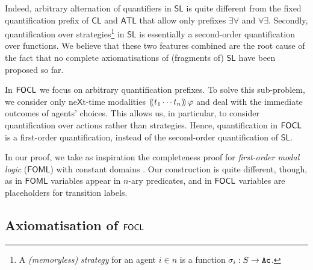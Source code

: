 \documentclass{article}
\begin{document}
Indeed, arbitrary alternation of quantifiers in $\mathsf{SL}$ is quite different from the fixed quantification prefix of $\mathsf{CL}$ and $\mathsf{ATL}$ that allow only prefixes $\exists \forall$ and $\forall \exists$. Secondly, quantification over strategies\footnote{A \emph{(memoryless) strategy} for an agent $i \in n$ is a function $\sigma_i: S \to \texttt{Ac}$.}  in $\mathsf{SL}$ is essentially a second-order quantification over functions. We believe that these two features combined are the root cause of the fact that no complete axiomatisations of (fragments of) $\mathsf{SL}$ %
have been proposed so far. 

In $\mathsf{FOCL}$ we focus on arbitrary quantification prefixes. To solve this sub-problem, we consider only ne$\mathsf{X}$t-time modalities $(\!( t_1\cdots t_n )\!)\, \varphi$ and deal with the immediate outcomes of agents' choices. 
This allows us, in particular, to consider quantification over actions rather than strategies. %
Hence, quantification in $\mathsf{FOCL}$ is a first-order quantification, instead of the second-order quantification of $\mathsf{SL}$. %

In our proof, we take as inspiration the completeness proof for \textit{first-order modal logic} ($\mathsf{FOML}$) with constant domains \cite{Garson1984}. Our construction is quite different, though, as in $\mathsf{FOML}$ variables appear in $n$-ary predicates, and in $\mathsf{FOCL}$ variables are placeholders for transition labels.  

\subsection{Axiomatisation of $\mathsf{FOCL}$}
\end{document}
